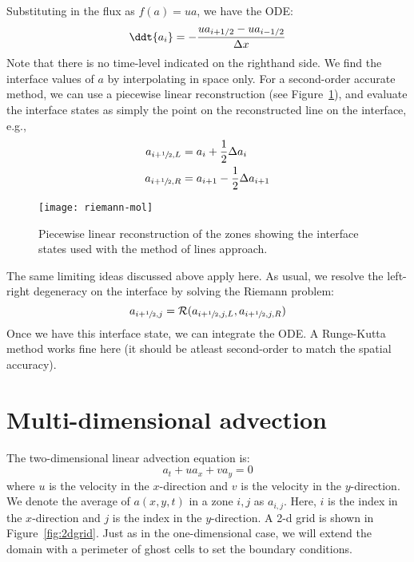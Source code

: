 Substituting in the flux as $f(a) = ua$, we have the ODE:
\begin{equation}
\ddt{a_i} = - \frac{u a_{i+1/2} - u a_{i-1/2}}{\Delta x}
\end{equation}
Note that there is no time-level indicated on the righthand side.  We
find the interface values of $a$ by interpolating in space only.  For
a second-order accurate method, we can use a piecewise linear
reconstruction (see Figure~\ref{fig:advection:riemann-mol}), and
evaluate the interface states as simply the point on the reconstructed
line on the interface, e.g.,
\begin{align}
a_{i+{\sfrac{1}{2}},L} &= a_{i} + \frac{1}{2} \Delta a_{i} \\
a_{i+{\sfrac{1}{2}},R} &= a_{i+1} - \frac{1}{2} \Delta a_{i+1}
\end{align}
%
\begin{figure}[t]
\centering
\texttt{[image: riemann-mol]}
\caption[Method-of-lines spatial
  reconstruction]{\label{fig:advection:riemann-mol} Piecewise linear
  reconstruction of the zones showing the interface states used with
  the method of lines approach.}
\end{figure}
%
The same limiting ideas discussed above apply here.  As usual, we
resolve the left-right degeneracy on the interface by solving the
Riemann problem:
\begin{equation}
a_{i+{\sfrac{1}{2}},j} = \mathcal{R}(a_{i+{\sfrac{1}{2}},j,L}, a_{i+{\sfrac{1}{2}},j,R})
\end{equation}
Once we have this interface state, we can integrate the ODE.  A
Runge-Kutta method works fine here (it should be atleast second-order
to match the spatial accuracy).
\section{Multi-dimensional advection}

The two-dimensional linear advection equation is:
\begin{equation}
a_t + u a_x + v a_y = 0
\label{eq:advect2d}
\end{equation}
where $u$ is the velocity in the $x$-direction and $v$ is the velocity in
the $y$-direction.  We denote the average of $a(x,y,t)$ in a zone $i,j$ as
$a_{i,j}$.  Here, $i$ is the index in the $x$-direction and $j$ is the
index in the $y$-direction.  A 2-d grid is shown in Figure~\ref{fig:2dgrid}.
Just as in the one-dimensional case, we will extend the domain with a
perimeter of ghost cells to set the boundary conditions.

